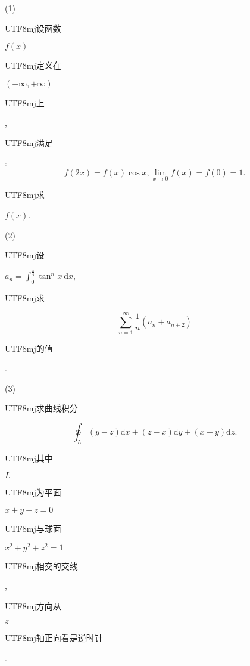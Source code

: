 \documentclass[10pt]{article}
\begin{document}
(1) \begin{CJK}{UTF8}{mj}设函数\end{CJK} $f(x)$ \begin{CJK}{UTF8}{mj}定义在\end{CJK} $(-\infty,+\infty)$ \begin{CJK}{UTF8}{mj}上\end{CJK}, \begin{CJK}{UTF8}{mj}满足\end{CJK}:
$$
f(2 x)=f(x) \cos x, \lim _{x \rightarrow 0} f(x)=f(0)=1 .
$$
\begin{CJK}{UTF8}{mj}求\end{CJK} $f(x)$.

(2) \begin{CJK}{UTF8}{mj}设\end{CJK} $a_{n}=\int_{0}^{\frac{\pi}{4}} \tan ^{n} x \mathrm{~d} x$, \begin{CJK}{UTF8}{mj}求\end{CJK}
$$
\sum_{n=1}^{\infty} \frac{1}{n}\left(a_{n}+a_{n+2}\right)
$$
\begin{CJK}{UTF8}{mj}的值\end{CJK}.

(3) \begin{CJK}{UTF8}{mj}求曲线积分\end{CJK}
$$
\oint_{L}(y-z) \mathrm{d} x+(z-x) \mathrm{d} y+(x-y) \mathrm{d} z .
$$
\begin{CJK}{UTF8}{mj}其中\end{CJK} $L$ \begin{CJK}{UTF8}{mj}为平面\end{CJK} $x+y+z=0$ \begin{CJK}{UTF8}{mj}与球面\end{CJK} $x^{2}+y^{2}+z^{2}=1$ \begin{CJK}{UTF8}{mj}相交的交线\end{CJK}, \begin{CJK}{UTF8}{mj}方向从\end{CJK} $z$ \begin{CJK}{UTF8}{mj}轴正向看是逆时针\end{CJK}.
\end{document}
